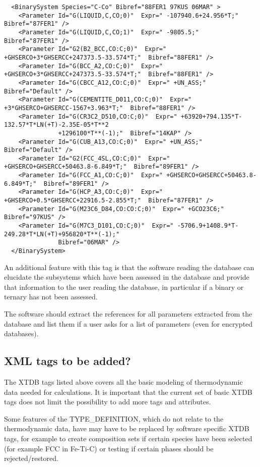 \documentclass{article}
\begin{document}
{\begin{verbatim}
  <BinarySystem Species="C-Co" Bibref="88FER1 97KUS 06MAR" >
    <Parameter Id="G(LIQUID,C,CO;0)"  Expr=" -107940.6+24.956*T;"  Bibref="87FER1" />
    <Parameter Id="G(LIQUID,C,CO;1)"  Expr=" -9805.5;"  Bibref="87FER1" />
    <Parameter Id="G2(B2_BCC,CO:C;0)"  Expr=" +GHSERCO+3*GHSERCC+247373.5-33.574*T;"  Bibref="88FER1" />
    <Parameter Id="G(BCC_A2,CO:C;0)"  Expr=" +GHSERCO+3*GHSERCC+247373.5-33.574*T;"  Bibref="88FER1" />
    <Parameter Id="G(CBCC_A12,CO:C;0)"  Expr=" +UN_ASS;"  Bibref="Default" />
    <Parameter Id="G(CEMENTITE_D011,CO:C;0)"  Expr=" +3*GHSERCO+GHSERCC-1567+3.963*T;"  Bibref="88FER1" />
    <Parameter Id="G(CR3C2_D510,CO:C;0)"  Expr=" +63920+794.135*T-132.57*T*LN(+T)-2.35E-05*T**2
               +1296100*T**(-1);"  Bibref="14KAP" />
    <Parameter Id="G(CUB_A13,CO:C;0)"  Expr=" +UN_ASS;"  Bibref="Default" />
    <Parameter Id="G2(FCC_4SL,CO:C;0)"  Expr=" +GHSERCO+GHSERCC+50463.8-6.849*T;"  Bibref="89FER1" />
    <Parameter Id="G(FCC_A1,CO:C;0)"  Expr=" +GHSERCO+GHSERCC+50463.8-6.849*T;"  Bibref="89FER1" />
    <Parameter Id="G(HCP_A3,CO:C;0)"  Expr=" +GHSERCO+0.5*GHSERCC+22916.5-2.855*T;"  Bibref="87FER1" />
    <Parameter Id="G(M23C6_D84,CO:CO:C;0)"  Expr=" +GCO23C6;"  Bibref="97KUS" />
    <Parameter Id="G(M7C3_D101,CO:C;0)"  Expr=" -5706.9+1408.9*T-249.28*T*LN(+T)+956820*T**(-1);"
               Bibref="06MAR" />
  </BinarySystem>
\end{verbatim}
}

An additional feature with this tag is that the software reading the
database can elucidate the subsystems which have been assessed in the
database and provide that information to the user reading the
database, in particular if a binary or ternary has not been assessed.

The software should extract the references for all parameters
extracted from the database and list them if a user asks for a list of
parameters (even for encrypted databases).

\subsection{XML tags to be added?}

The XTDB tags listed above covers all the basic modeling of
thermodynamic data needed for calculations.  It is important that the
current set of basic XTDB tags does not limit the possibility to add
more tags and attributes.

Some features of the TYPE\_DEFINITION, which do not relate to the
thermodynamic data, have may have to be replaced by software specific
XTDB tags, for example to create composition sets if certain species
have been selected (for example FCC in Fe-Ti-C) or testing if certain
phases should be rejected/restored.
\end{document}
